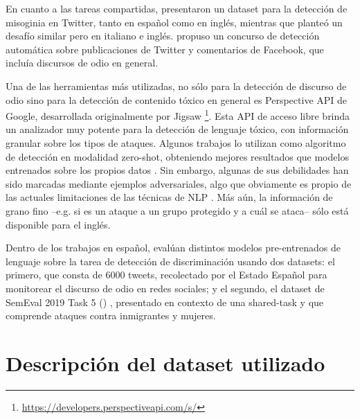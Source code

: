 En cuanto a las tareas compartidas, \citet{fersini2018overview} presentaron un dataset para la detección de misoginia en Twitter, tanto en español como en inglés, mientras que \citet{fersini2018evalitaoverview} planteó un desafío similar pero en italiano e inglés. \citet{bosco2018overview} propuso un concurso de detección automática sobre publicaciones de Twitter y comentarios de Facebook, que incluía discursos de odio en general.

Una de las herramientas más utilizadas, no sólo para la detección de discurso de odio sino para la detección de contenido tóxico en general es Perspective API de Google, desarrollada originalmente por Jigsaw \footnote{\url{https://developers.perspectiveapi.com/s/}}. Esta API de acceso libre brinda un analizador muy potente para la detección de lenguaje tóxico, con información granular sobre los tipos de ataques. Algunos trabajos lo utilizan como algoritmo de detección en modalidad zero-shot, obteniendo mejores resultados que modelos entrenados sobre los propios datos \cite{pavlopoulos2020toxicity}. Sin embargo, algunas de sus debilidades han sido marcadas mediante ejemplos adversariales, algo que obviamente es propio de las actuales limitaciones de las técnicas de NLP \cite{hosseini2017deceiving,jain2018adversarial}. Más aún, la información de grano fino --e.g. si es un ataque a un grupo protegido y a cuál se ataca-- sólo está disponible para el inglés.

Dentro de los trabajos en español, \citet{plaza2021pretrained} evalúan distintos modelos pre-entrenados de lenguaje sobre la tarea de detección de discriminación usando dos datasets: el primero, \citet{pereira2019detecting} que consta de 6000 tweets, recolectado por el Estado Español para monitorear el discurso de odio en redes sociales; y el segundo, el dataset de SemEval 2019 Task 5 (\hateval{}) \cite{hateval2019semeval}, presentado en contexto de una shared-task y que comprende ataques contra inmigrantes y mujeres.


\section{Descripción del dataset utilizado}
\label{sec:hateval_dataset}

